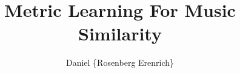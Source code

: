 \documentclass[a4paper,10pt]{article}
\title{Metric Learning For Music Similarity}
\author{Daniel \{Rosenberg Erenrich\} }
\begin{document}
\maketitle

\begin{abstract}

\end{abstract}

\section{}
\end{document}
